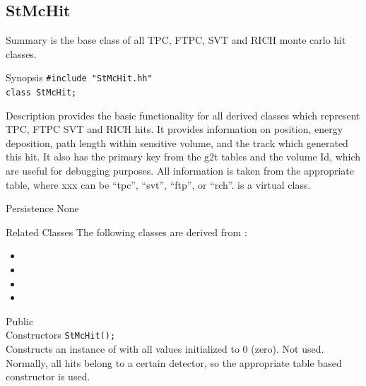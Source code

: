 \clearpage
%
%
\subsection{StMcHit}
 
\label{sec:StMcHit}
\begin{Entry}
\item[Summary]
     is the base class of all TPC, FTPC, SVT and RICH
    monte carlo hit classes.

\item[Synopsis]
    \verb+#include "StMcHit.hh"+\\
    \verb+class StMcHit;+\\

\item[Description]
     provides the basic functionality for all derived classes
    which represent TPC, FTPC SVT and RICH hits. It provides information on
    position, energy deposition, path length within sensitive volume,
    and the track which
    generated this hit.  It also has the primary key from the g2t tables and the
    volume Id, which are useful for debugging purposes. All information is taken from
    the appropriate  table, where xxx can be ``tpc'', ``svt'',
    ``ftp'', or ``rch''.
     is a virtual class.

\item[Persistence]
    None

\item[Related Classes]
    The following classes are derived from :
    \begin{itemize}
    \item {}
    \item {}
    \item {}
    \item {}
    \end{itemize}

\item[Public\\ Constructors]
    \verb+StMcHit();+\\
    Constructs an instance of  with all values initialized
    to 0 (zero).  Not used.  Normally, all hits belong to a certain detector,
    so the appropriate table based constructor is used.


\end{Entry}
